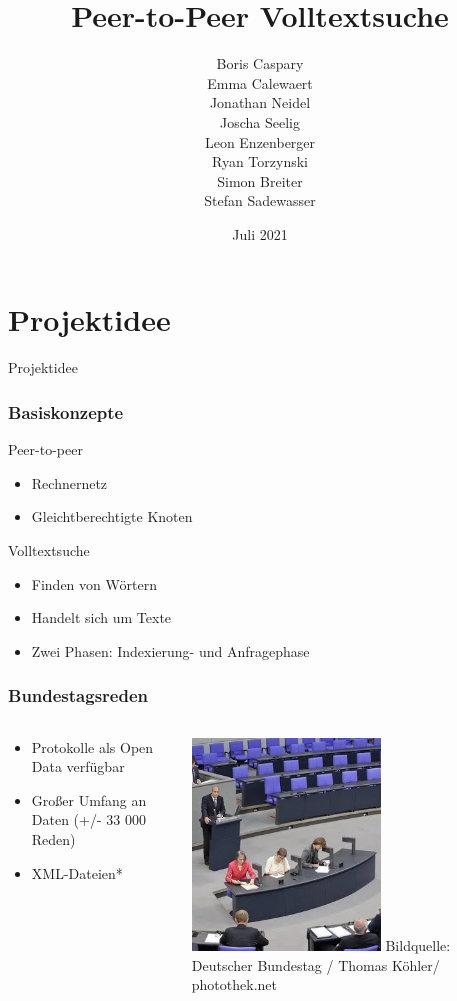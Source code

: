 \documentclass{beamer}
\title{Peer-to-Peer Volltextsuche}
\subtitle{}
\author{
  Boris Caspary \\
  Emma Calewaert \\
  Jonathan Neidel \\
  Joscha Seelig \\
  Leon Enzenberger \\
  Ryan Torzynski \\
  Simon Breiter \\
  Stefan Sadewasser \\
}
\date{Juli 2021}
\institute{HTW Berlin, Angewandte Informatik, Projektstudium bei Herr Hoppe}
\begin{document}
\frame{\titlepage}

\section{Projektidee}
\begin{frame}
  \begin{center}
    {\Huge Projektidee}
  \end{center}
\end{frame}

\begin{frame}[allowframebreaks]
  \frametitle{Basiskonzepte}
  Peer-to-peer
  \begin{itemize}
    \item Rechnernetz
    \item Gleichtberechtigte Knoten
  \end{itemize}

  \break
  Volltextsuche
    \begin{itemize}
    \item Finden von Wörtern
    \item Handelt sich um Texte
    \item Zwei Phasen: Indexierung- und Anfragephase
  \end{itemize}
\end{frame}

\begin{frame}
  \frametitle{Bundestagsreden}
  \begin{columns}
    \begin{column}{0.5\textwidth}
      \begin{itemize}
        \item Protokolle als Open Data verfügbar
        \item Großer Umfang an Daten (+/- 33 000 Reden)
        \item XML-Dateien*
      \end{itemize}
    \end{column}
    \begin{column}{0.5\textwidth}
      \includegraphics[width=5cm]{BundestagProtokoll}
      {\tiny Bildquelle: Deutscher Bundestag / Thomas Köhler/ photothek.net}
    \end{column}
  \end{columns}
\end{frame}
\end{document}
